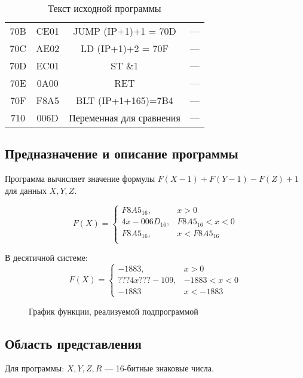 \begin{table}[h!]
\begin{longtable}{| c | c | c | p{9.5cm} |}
        70B   & CE01        & JUMP (IP+1)+1 = 70D & ---                                                   \\
        70C   & AE02        & LD (IP+1)+2 = 70F   & ---                                                   \\
        70D   & EC01        & ST \&1              & ---                                                   \\
        70E   & 0A00        & RET                 & ---                                                   \\
        70F   & F8A5        & BLT (IP+1+165)=7B4  & ---                                                   \\
        710 & 006D & Переменная для сравнения & --- \\
        \hline
    \end{longtable}
    \caption{Текст исходной программы}
\end{table}

\subsection{Предназначение и описание программы}
Программа вычисляет значение формулы $F(X-1) + F(Y-1) - F(Z) + 1$ для данных $X, Y, Z$.

\[ 
   F(X) = \begin{cases}
    F8A5_{16}, & x > 0 \\
    4x - 006D_{16}, & F8A5_{16} < x < 0 \\
    F8A5_{16}, & x < F8A5_{16} \\
   \end{cases}
\]

В десятичной системе:
\[ 
  F(X) = \begin{cases}
    -1883, & x > 0 \\
    ???4x ??? - 109, & -1883 < x < 0 \\
    -1883 & x < -1883
  \end{cases}
\]
\begin{figure}
    \centering
    
    \caption{График функции, реализуемой подпрограммой}
\end{figure}

\subsection{Область представления}
Для программы:
$X, Y, Z, R$ --- 16-битные знаковые числа.

